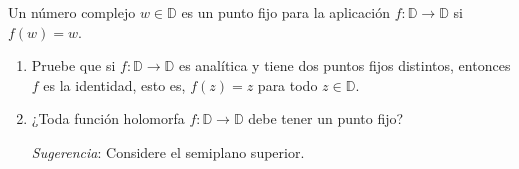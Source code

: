 \setcounter{eje}{11}
\begin{ejer}
Un número complejo $w \in \mathbb{D}$ es un punto fijo para la aplicación $f\colon \mathbb{D} \to \mathbb{D}$ si $f(w) = w$.
\begin{enumerate}[label=(\alph*),leftmargin=1.5em]
\item Pruebe que si $f\colon \mathbb{D} \to \mathbb{D}$ es analítica y tiene dos puntos fijos distintos, entonces $f$ es la identidad, esto es, $f(z) = z$ para todo $z \in \mathbb{D}$.
\item ¿Toda función holomorfa $f\colon \mathbb{D} \to \mathbb{D}$ debe tener un punto fijo?\par \emph{Sugerencia}: Considere el semiplano superior.
\end{enumerate}
\end{ejer}

